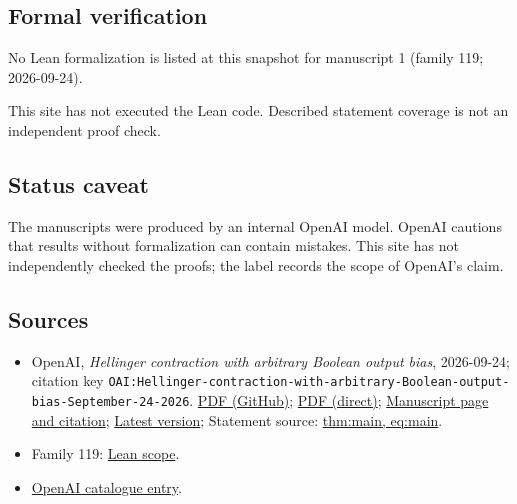 \documentclass[11pt]{article}
\begin{document}
\subsection{Formal verification}
No Lean formalization is listed at this snapshot for manuscript 1 (family 119; 2026-09-24).

This site has not executed the Lean code. Described statement coverage is not an independent proof check.

\subsection{Status caveat}
The manuscripts were produced by an internal OpenAI model. OpenAI cautions that results without formalization can contain mistakes. This site has not independently checked the proofs; the label records the scope of OpenAI's claim.

\subsection{Sources}
\begin{itemize}
\item OpenAI, \emph{Hellinger contraction with arbitrary Boolean output bias}, 2026-09-24; citation key \texttt{OAI:Hellinger-contraction-with-arbitrary-Boolean-output-bias-September-24-2026}. \href{https://github.com/openai/math/blob/adc7f1241b42e322a6451854ab7e4b4c146bf78a/preprints/Hellinger-contraction-with-arbitrary-Boolean-output-bias-September-24-2026/main.pdf}{PDF (GitHub)}; \href{https://github.com/openai/math/raw/adc7f1241b42e322a6451854ab7e4b4c146bf78a/preprints/Hellinger-contraction-with-arbitrary-Boolean-output-bias-September-24-2026/main.pdf}{PDF (direct)}; \href{https://github.com/openai/math/blob/adc7f1241b42e322a6451854ab7e4b4c146bf78a/preprints/Hellinger-contraction-with-arbitrary-Boolean-output-bias-September-24-2026/README.md}{Manuscript page and citation}; \href{https://github.com/openai/math/blob/main/preprints/Hellinger-contraction-with-arbitrary-Boolean-output-bias-September-24-2026/main.pdf}{Latest version}; Statement source: \href{https://github.com/openai/math/blob/adc7f1241b42e322a6451854ab7e4b4c146bf78a/preprints/Hellinger-contraction-with-arbitrary-Boolean-output-bias-September-24-2026/build/main.tex\#L54}{thm:main, eq:main}.
\item Family 119: \href{https://github.com/openai/math/blob/adc7f1241b42e322a6451854ab7e4b4c146bf78a/lean/docs/119.md}{Lean scope}.
\item \href{https://github.com/openai/math/blob/adc7f1241b42e322a6451854ab7e4b4c146bf78a/CONTENTS.md}{OpenAI catalogue entry}.
\end{itemize}
\end{document}

